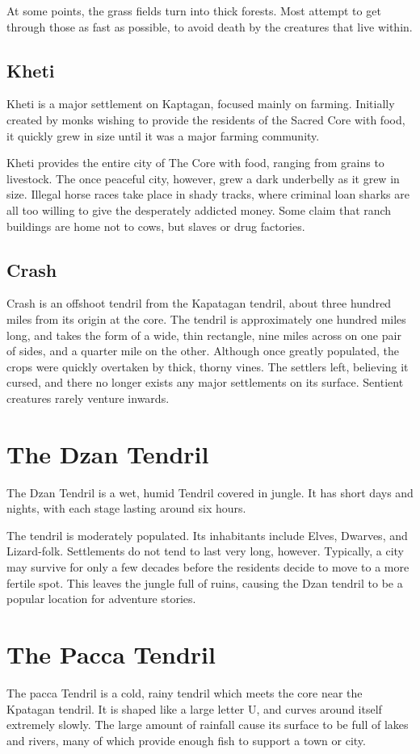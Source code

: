 \begin{multicols}{2}
At some points, the grass fields turn into thick forests.
Most attempt to get through those as fast as possible, to avoid death by the creatures that live within.

\subsection{Kheti}
Kheti is a major settlement on Kaptagan, focused mainly on farming.
Initially created by monks wishing to provide the residents of the Sacred Core with food, it quickly grew in size until it was a major farming community.

Kheti provides the entire city of The Core with food, ranging from grains to livestock.
The once peaceful city, however, grew a dark underbelly as it grew in size.
Illegal horse races take place in shady tracks, where criminal loan sharks are all too willing to give the desperately addicted money.
Some claim that ranch buildings are home not to cows, but slaves or drug factories.

\subsection{Crash}
Crash is an offshoot tendril from the Kapatagan tendril, about three hundred miles from its origin at the core.
The tendril is approximately one hundred miles long, and takes the form of a wide, thin rectangle, nine miles across on one pair of sides, and a quarter mile on the other.
Although once greatly populated, the crops were quickly overtaken by thick, thorny vines.
The settlers left, believing it cursed, and there no longer exists any major settlements on its surface.
Sentient creatures rarely venture inwards.

\section{The Dzan Tendril}
The Dzan Tendril is a wet, humid Tendril covered in jungle.
It has short days and nights, with each stage lasting around six hours.

The tendril is moderately populated.
Its inhabitants include Elves, Dwarves, and Lizard-folk.
Settlements do not tend to last very long, however.
Typically, a city may survive for only a few decades before the residents decide to move to a more fertile spot.
This leaves the jungle full of ruins, causing the Dzan tendril to be a popular location for adventure stories.
\section{The Pacca Tendril}
The pacca Tendril is a cold, rainy tendril which meets the core near the Kpatagan tendril.
It is shaped like a large letter U, and curves around itself extremely slowly.
The large amount of rainfall cause its surface to be full of lakes and rivers, many of which provide enough fish to support a town or city.


\end{multicols}

